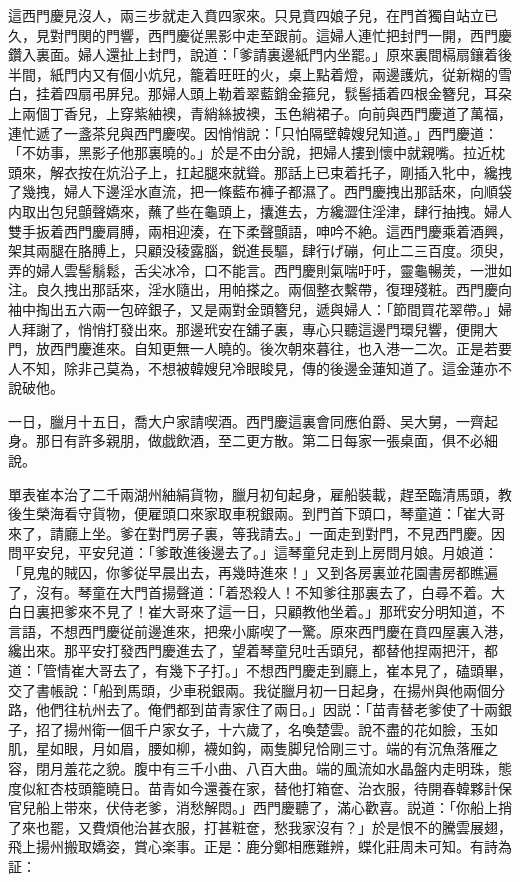 這西門慶見沒人，兩三步就走入賁四家來。只見賁四娘子兒，在門首獨自站立已久，見對門関的門響，西門慶従黑影中走至跟前。這婦人連忙把封門一開，西門慶鑽入裏面。婦人還扯上封門，說道：「爹請裏邊紙門内坐罷。」原來裏間槅扇鑲着後半間，紙門内又有個小炕兒，籠着旺旺的火，桌上點着燈，兩邊護炕，従新糊的雪白，挂着四扇弔屏兒。那婦人頭上勒着翠藍銷金箍兒，䯼髻插着四根金簪兒，耳朶上兩個丁香兒，上穿紫紬襖，青綃絲披襖，玉色綃裙子。向前與西門慶道了萬福，連忙遞了一盞茶兒與西門慶喫。因悄悄說：「只怕隔壁韓嫂兒知道。」西門慶道：「不妨事，黑影子他那裏曉的。」於是不由分說，把婦人摟到懷中就親嘴。拉近枕頭來，解衣按在炕沿子上，扛起腿來就聳。那話上已束着托子，剛插入牝中，纔拽了幾拽，婦人下邊淫水直流，把一條藍布褲子都濕了。西門慶拽出那話來，向順袋内取出包兒顫聲嬌來，蘸了些在龜頭上，攮進去，方纔澀住淫津，肆行抽拽。婦人雙手扳着西門慶肩膊，兩相迎湊，在下柔聲顫語，呻吟不絶。這西門慶乘着酒興，架其兩腿在胳膊上，只顧没稜露腦，鋭進長驅，肆行げ磞，何止二三百度。须臾，弄的婦人雲髻鬅鬆，舌尖冰冷，口不能言。西門慶則氣喘吁吁，靈龜暢羙，一泄如注。良久拽出那話來，淫水隨出，用帕搽之。兩個整衣繫帶，復理殘粧。西門慶向袖中掏出五六兩一包碎銀子，又是兩對金頭簪兒，遞與婦人：「節間買花翠帶。」婦人拜謝了，悄悄打發出來。那邊玳安在舖子裏，專心只聽這邊門環兒響，便開大門，放西門慶進來。自知更無一人曉的。後次朝來暮往，也入港一二次。正是若要人不知，除非己莫為，不想被韓嫂兒冷眼睃見，傳的後邊金蓮知道了。這金蓮亦不說破他。

一日，臘月十五日，喬大户家請喫酒。西門慶這裏會同應伯爵、吴大舅，一齊起身。那日有許多親朋，做戯飲酒，至二更方散。第二日每家一張桌面，俱不必細說。

單表崔本治了二千兩湖州紬絹貨物，臘月初旬起身，雇船裝載，趕至臨清馬頭，教後生榮海看守貨物，便雇頭口來家取車稅銀兩。到門首下頭口，琴童道：「崔大哥來了，請廳上坐。爹在對門房子裏，等我請去。」一面走到對門，不見西門慶。因問平安兒，平安兒道：「爹敢進後邊去了。」這琴童兒走到上房問月娘。月娘道：「見鬼的賊囚，你爹従早晨出去，再幾時進來！」又到各房裏並花園書房都瞧遍了，沒有。琴童在大門首揚聲道：「着恐殺人！不知爹往那裏去了，白尋不着。大白日裏把爹來不見了！崔大哥來了這一日，只顧教他坐着。」那玳安分明知道，不言語，不想西門慶従前邊進來，把衆小廝喫了一驚。原來西門慶在賁四屋裏入港，纔出來。那平安打發西門慶進去了，望着琴童兒吐舌頭兒，都替他捏兩把汗，都道：「管情崔大哥去了，有幾下子打。」不想西門慶走到廳上，崔本見了，磕頭畢，交了書帳說：「船到馬頭，少車税銀兩。我従臘月初一日起身，在揚州與他兩個分路，他們往杭州去了。俺們都到苗青家住了兩日。」因説：「苗青替老爹使了十兩銀子，招了揚州衛一個千户家女子，十六歲了，名喚楚雲。說不盡的花如臉，玉如肌，星如眼，月如眉，腰如柳，襪如鈎，兩隻脚兒恰剛三寸。端的有沉魚落雁之容，閉月羞花之貌。腹中有三千小曲、八百大曲。端的風流如水晶盤内走明珠，態度似紅杏枝頭籠曉日。苗青如今還養在家，替他打箱奩、治衣服，待開春韓夥計保官兒船上带來，伏侍老爹，消愁解悶。」西門慶聽了，滿心歡喜。説道：「你船上捎了來也罷，又費煩他治甚衣服，打甚粧奩，愁我家沒有？」於是恨不的騰雲展翅，飛上揚州搬取嬌姿，賞心楽事。正是：鹿分鄭相應難辨，蝶化莊周未可知。有詩為証：

